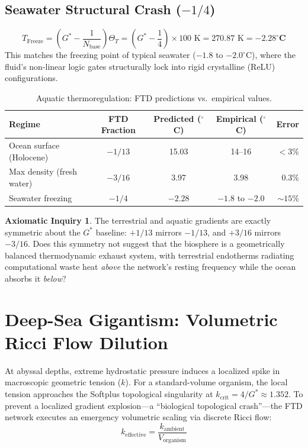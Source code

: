 \documentclass[11pt, letterpaper]{article}
\newcommand{\G}{G^*}
\theoremstyle{definition}
\newtheorem{inquiry}{Axiomatic Inquiry}[section]
\theoremstyle{remark}
\begin{document}
\subsection{Seawater Structural Crash ($-1/4$)}
\begin{equation}
    T_{\text{Freeze}} = \left(\G - \frac{1}{N_{\text{base}}}\right)\Theta_T = \left(\G - \frac{1}{4}\right) \times 100 \text{ K} = 270.87 \text{ K} = \mathbf{-2.28^\circ\text{C}}
\end{equation}
This matches the freezing point of typical seawater ($-1.8$ to $-2.0^\circ$C), where the fluid's non-linear logic gates structurally lock into rigid crystalline (ReLU) configurations.

\begin{table}[hbt!]
\centering
\caption{Aquatic thermoregulation: FTD predictions vs.\ empirical values.}
\label{tab:aquatic}
\begin{tabular}{@{}lcccr@{}}
\toprule
\textbf{Regime} & \textbf{FTD Fraction} & \textbf{Predicted ($^\circ$C)} & \textbf{Empirical ($^\circ$C)} & \textbf{Error} \\
\midrule
Ocean surface (Holocene) & $-1/13$ & 15.03 & 14--16 & $<3\%$ \\
Max density (fresh water) & $-3/16$ & 3.97 & 3.98 & $0.3\%$ \\
Seawater freezing & $-1/4$ & $-2.28$ & $-1.8$ to $-2.0$ & $\sim 15\%$ \\
\bottomrule
\end{tabular}
\end{table}

\begin{inquiry}
The terrestrial and aquatic gradients are exactly symmetric about the $\G$ baseline: $+1/13$ mirrors $-1/13$, and $+3/16$ mirrors $-3/16$. Does this symmetry not suggest that the biosphere is a geometrically balanced thermodynamic exhaust system, with terrestrial endotherms radiating computational waste heat \textit{above} the network's resting frequency while the ocean absorbs it \textit{below}?
\end{inquiry}

\section{Deep-Sea Gigantism: Volumetric Ricci Flow Dilution}

At abyssal depths, extreme hydrostatic pressure induces a localized spike in macroscopic geometric tension ($k$). For a standard-volume organism, the local tension approaches the Softplus topological singularity at $k_{\text{crit}} = 4/\G \approx 1.352$. To prevent a localized gradient explosion---a ``biological topological crash''---the FTD network executes an emergency volumetric scaling via discrete Ricci flow:
\begin{equation}
    k_{\text{effective}} = \frac{k_{\text{ambient}}}{V_{\text{organism}}}
\end{equation}
\end{document}
